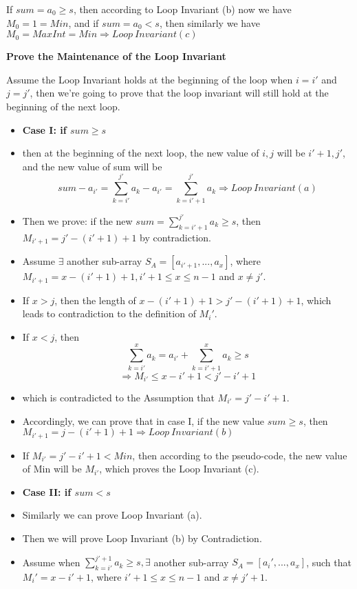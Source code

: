 \documentclass[12pt]{article}
\newenvironment{solution}[2][Solution]{\begin{trivlist}
\item[\hskip \labelsep {\bfseries #1}]}{\end{trivlist}}
\begin{document}
\begin{solution}{}
    \item[] If $sum=a_0\geq s$, then according to Loop Invariant (b) now we have $M_0=1=Min$, and if $sum=a_0<s$, then similarly we have $M_0=MaxInt=Min\Rightarrow Loop\ Invariant(c)$
    \item[(IV)] \textbf{Prove the Maintenance of the Loop Invariant}
    \item[] Assume the Loop Invariant holds at the beginning of the loop when $i=i'$ and $j=j'$, then we're going to prove that the loop invariant will still hold at the beginning of the next loop.
    \begin{itemize}
        \item[]\textbf{Case I: if $sum\geq s$}
        \item[] then at the beginning of the next loop, the new value of $i,j$ will be $i'+1,j'$, and the new value of sum will be
        \[sum-a_{i'}=\sum_{k=i'}^{j'}{a_k}-a_{i'}=\sum_{k=i'+1}^{j'}{a_k}\Rightarrow Loop\ Invariant(a)\]
        \item[] Then we prove: if the new $sum=\sum_{k=i'+1}^{j'}{a_k}\geq s$, then $M_{i'+1}=j'-(i'+1)+1$ by contradiction.
        \item[] Assume $\exists$ another sub-array $S_A=[a_{i'+1},...,a_x]$, where $M_{i'+1}=x-(i'+1)+1, i'+1\leq x\leq n-1$ and $x\neq j'$.
        \item[] If $x>j$, then the length of $x-(i'+1)+1>j'-(i'+1)+1$, which leads to contradiction to the definition of $M_i'$.
        \item[] If $x<j$, then 
        \[\sum_{k=i'}^{x}{a_k}=a_{i'}+\sum_{k=i'+1}^{x}{a_k}\geq s\]
        \[\Rightarrow M_{i'}\leq x-i'+1<j'-i'+1\]
        \item[] which is contradicted to the Assumption that $M_{i'}=j'-i'+1$.
        \item[] Accordingly, we can prove that in case I, if the new value $sum\geq s$, then $M_{i'+1}=j-(i'+1)+1\Rightarrow Loop\ Invariant(b)$
        \item[] If $M_{i'}=j'-i'+1<Min$, then according to the pseudo-code, the new value of Min will be $M_{i'}$, which proves the Loop Invariant (c).
        \item[]\textbf{Case II: if $sum<s$}
        \item[] Similarly we can prove Loop Invariant (a).
        \item[] Then we will prove Loop Invariant (b) by Contradiction.
        \item[] Assume when $\sum_{k=i'}^{j'+1}{a_k}\geq s, \exists$ another sub-array $S_A=[a_i',...,a_x]$, such that $M_i'=x-i'+1$, where $i'+1\leq x\leq n-1$ and $x\neq j'+1$.

\end{itemize}
\end{solution}
\end{document}
